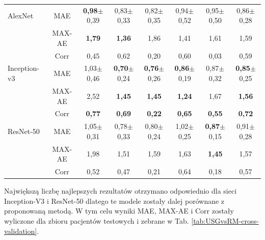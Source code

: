 \begin{table}[h]
\begin{tabular}{lc||c|c|c|c|c|c}
		AlexNet & MAE & \textbf{0,98}$\pm$0,39 & 0,83$\pm$0,33 & 0,82$\pm$0,35 & 0,94$\pm$0,52 & 0,95$\pm$0,50 & 0,86$\pm$0,28  \\
		& MAX-AE & \textbf{1,79} & \textbf{1,36} & 1,86 & 1,41 & 1,61 & 1,59 \\ 
		& Corr & 0,45 & 0,62 & 0,20 & 0,60 & 0,03 & 0,59 \\ \hline
		Inception-v3 & MAE & 1,03$\pm$0,46 & \textbf{0,70}$\pm$0,24 & \textbf{0,76}$\pm$0,26 & \textbf{0,86}$\pm$0,19 & 0,87$\pm$0,32 & \textbf{0,85}$\pm$0,25  \\
		& MAX-AE & 2,52 & \textbf{1,45} & \textbf{1,45} & \textbf{1,24} & 1,67 & \textbf{1,56} \\ 
		& Corr & \textbf{0,77} & \textbf{0,69} & \textbf{0,22} & \textbf{0,65} & \textbf{0,55} & \textbf{0,72} \\ \hline
		ResNet-50 & MAE & 1,05$\pm$0,31 & 0,78$\pm$0,33 & 0,80$\pm$0,24 & 1,02$\pm$0,25 & \textbf{0,87}$\pm$0,15 & 0,91$\pm$0,28 \\
		& MAX-AE & 1,98 & 1,51 & 1,59 & 1,63 & \textbf{1,45} & 1,57 \\
		& Corr & 0,52 & 0,47 & 0,21 & 0,64 & 0,18 & 0,57 \\ 
	\end{tabular}
\end{table}
\renewcommand{\arraystretch}{1}

Największą liczbę najlepszych rezultatów otrzymano odpowiednio dla sieci Inception-V3 i ResNet-50 dlatego te modele zostały dalej porównane z proponowaną metodą. W tym celu wyniki MAE, MAX-AE i Corr zostały wyliczone dla zbioru pacjentów testowych i zebrane w Tab. \ref{tab:USGvsRM-cross-validation}.

